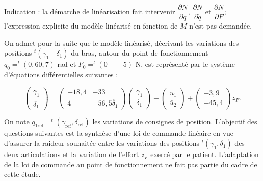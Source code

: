 \begin{multicols}{2}
\ifprof
\begin{corrige}
\end{corrige}
\else
\fi



\ifprof
\begin{corrige}
\end{corrige}
\else
\fi


Indication : la démarche de linéarisation fait intervenir $\dfrac{\partial N}{\partial q}$, $\dfrac{\partial N}{\partial \dot{q}}$ et $\dfrac{\partial N}{\partial F}$; l’expression explicite du modèle linéarisé
en fonction de $M$ n’est pas demandée.


On admet pour la suite que le modèle linéarisé, décrivant les variations des positions $ ^t\left(\gamma_1 \quad \delta_1 \right)$ du bras, autour du point de fonctionnement $q_0 = ^t\left(0,6 0,7\right)$ rad et $F_0 = ^t\left(0 \quad -5\right)$ N, est représenté par le système d’équations différentielles suivantes :


$$
\begin{pmatrix}
\ddot{\gamma_1} \\
\ddot{\delta_1}
\end{pmatrix}
=
\begin{pmatrix}
-18,4 & -33 \\
4 & -56,5
\ddot{\delta_1}
\end{pmatrix}
\begin{pmatrix}
{\gamma_1} \\
{\delta_1}
\end{pmatrix}
+
\begin{pmatrix}
\ddot{u_1} \\
\ddot{u_2}
\end{pmatrix}
+
\begin{pmatrix}
-3,9 \\
-45,4
\end{pmatrix}
z_F.
$$

On note $q_{1\text{ref}} = ^t\left(\gamma_{\text{ref}}, \delta_{\text{ref}} \right)$ les variations de consignes de position. L’objectif des questions suivantes est la
synthèse d’une loi de commande linéaire en vue d’assurer la raideur souhaitée entre les variations des positions  $ ^t\left(\gamma_{1}, \delta_{1} \right)$ des deux articulations et la variation de l’effort $z_F$ exercé par le patient. L’adaptation de la loi de
commande au point de fonctionnement ne fait pas partie du cadre de cette étude.





\end{multicols}

